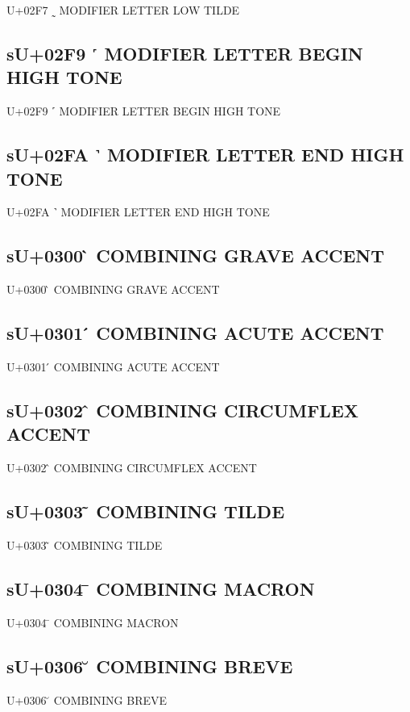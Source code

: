 U+02F7 ˷ MODIFIER LETTER LOW TILDE

\subsection{sU+02F9 ˹ MODIFIER LETTER BEGIN HIGH TONE}

U+02F9 ˹ MODIFIER LETTER BEGIN HIGH TONE

\subsection{sU+02FA ˺ MODIFIER LETTER END HIGH TONE}

U+02FA ˺ MODIFIER LETTER END HIGH TONE

\subsection{sU+0300 ̀ COMBINING GRAVE ACCENT}

U+0300 ̀ COMBINING GRAVE ACCENT

\subsection{sU+0301 ́ COMBINING ACUTE ACCENT}

U+0301 ́ COMBINING ACUTE ACCENT

\subsection{sU+0302 ̂ COMBINING CIRCUMFLEX ACCENT}

U+0302 ̂ COMBINING CIRCUMFLEX ACCENT

\subsection{sU+0303 ̃ COMBINING TILDE}

U+0303 ̃ COMBINING TILDE

\subsection{sU+0304 ̄ COMBINING MACRON}

U+0304 ̄ COMBINING MACRON

\subsection{sU+0306 ̆ COMBINING BREVE}

U+0306 ̆ COMBINING BREVE

